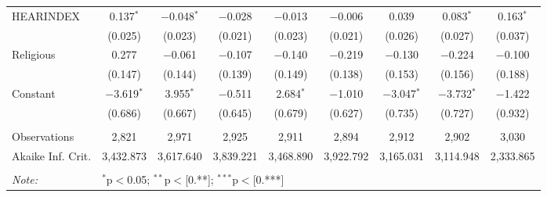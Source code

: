 \begin{table}[!htbp]
\begin{tabular}{@{\extracolsep{1pt}}lcccccccc}
  HEARINDEX & 0.137$^{*}$ & $-$0.048$^{*}$ & $-$0.028 & $-$0.013 & $-$0.006 & 0.039 & 0.083$^{*}$ & 0.163$^{*}$ \\ 
  & (0.025) & (0.023) & (0.021) & (0.023) & (0.021) & (0.026) & (0.027) & (0.037) \\ 
  Religious & 0.277 & $-$0.061 & $-$0.107 & $-$0.140 & $-$0.219 & $-$0.130 & $-$0.224 & $-$0.100 \\ 
  & (0.147) & (0.144) & (0.139) & (0.149) & (0.138) & (0.153) & (0.156) & (0.188) \\ 
  Constant & $-$3.619$^{*}$ & 3.955$^{*}$ & $-$0.511 & 2.684$^{*}$ & $-$1.010 & $-$3.047$^{*}$ & $-$3.732$^{*}$ & $-$1.422 \\ 
  & (0.686) & (0.667) & (0.645) & (0.679) & (0.627) & (0.735) & (0.727) & (0.932) \\ 
 \hline \\[-1.8ex] 
Observations & 2,821 & 2,971 & 2,925 & 2,911 & 2,894 & 2,912 & 2,902 & 3,030 \\ 
Akaike Inf. Crit. & 3,432.873 & 3,617.640 & 3,839.221 & 3,468.890 & 3,922.792 & 3,165.031 & 3,114.948 & 2,333.865 \\ 
\hline 
\hline \\[-1.8ex] 
\textit{Note:}  & \multicolumn{8}{l}{$^{*}$p$<$0.05; $^{**}$p$<$[0.**]; $^{***}$p$<$[0.***]} \\ 
\end{tabular} 
\end{table} 
